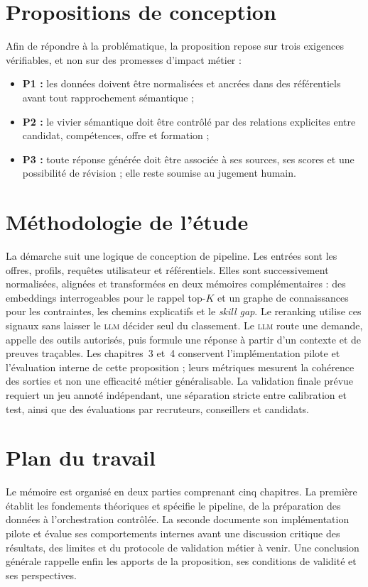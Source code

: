 \documentclass[12pt,twoside]{report}
\newcommand{\LLM}{\textsc{llm}}
\begin{document}
\section*{Propositions de conception}
Afin de répondre à la problématique, la proposition repose sur trois exigences vérifiables, et non sur des promesses d'impact métier :
\begin{itemize}
    \item \textbf{P1 :} les données doivent être normalisées et ancrées dans des référentiels avant tout rapprochement sémantique ;
    \item \textbf{P2 :} le vivier sémantique doit être contrôlé par des relations explicites entre candidat, compétences, offre et formation ;
    \item \textbf{P3 :} toute réponse générée doit être associée à ses sources, ses scores et une possibilité de révision ; elle reste soumise au jugement humain.
\end{itemize}
\vspace{-0.5cm}
\section*{Méthodologie de l'étude}
La démarche suit une logique de conception de pipeline. Les entrées sont les offres, profils, requêtes utilisateur et référentiels. Elles sont successivement normalisées, alignées et transformées en deux mémoires complémentaires : des embeddings interrogeables pour le rappel top-$K$ et un graphe de connaissances pour les contraintes, les chemins explicatifs et le \textit{skill gap}. Le reranking utilise ces signaux sans laisser le \LLM{} décider seul du classement. Le \LLM{} route une demande, appelle des outils autorisés, puis formule une réponse à partir d'un contexte et de preuves traçables. Les chapitres~3 et~4 conservent l'implémentation pilote et l'évaluation interne de cette proposition ; leurs métriques mesurent la cohérence des sorties et non une efficacité métier généralisable. La validation finale prévue requiert un jeu annoté indépendant, une séparation stricte entre calibration et test, ainsi que des évaluations par recruteurs, conseillers et candidats.
\vspace{-0.5cm}
\section*{Plan du travail}
Le mémoire est organisé en deux parties comprenant cinq chapitres. La première établit les fondements théoriques et spécifie le pipeline, de la préparation des données à l'orchestration contrôlée. La seconde documente son implémentation pilote et évalue ses comportements internes avant une discussion critique des résultats, des limites et du protocole de validation métier à venir. Une conclusion générale rappelle enfin les apports de la proposition, ses conditions de validité et ses perspectives.
\end{document}
